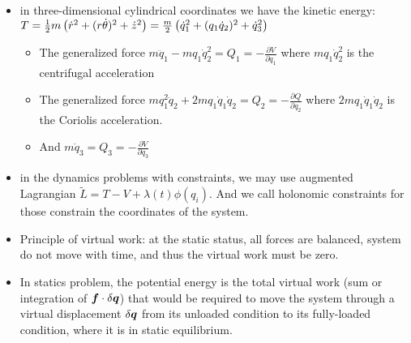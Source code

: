 \documentclass{article}
\begin{document}
\begin{itemize}
    \item in three-dimensional cylindrical coordinates we have the kinetic energy: \(T=\frac{1}{2}m\left( \dot r^2+(r\dot\theta)^2+\dot z^2 \right)=\frac{m}{2}\left( \dot q_1^2+(q_1\dot q_2)^2+\dot q_3^2 \right)\)
    \begin{itemize}
        \item The generalized force \(m\ddot q_1-mq_1\dot q_2^2=Q_1=-\frac{\partial V}{\partial q_1}\) where \(mq_1 \dot q_2^2\) is the centrifugal acceleration
        \item The generalized force \(mq_1^2\ddot q_2+2mq_1 \dot q_1\dot q_2=Q_2=-\frac{\partial Q}{\partial q_2}\) where \(2mq_1 \dot q_1\dot q_2\) is the Coriolis acceleration. 
        \item And \(m\ddot q_3=Q_3=-\frac{\partial V}{\partial q_3}\)
    \end{itemize}
    \item in the dynamics problems with constraints, we may use augmented Lagrangian \(\tilde L = T-V+\lambda(t) \phi(q_i)\). And we call holonomic constraints for those constrain the coordinates of the system.
    \item Principle of virtual work: at the static status, all forces are balanced, system do not move with time, and thus the virtual work must be zero.
    \item In statics problem, the potential energy is the total virtual work (sum or integration of \(\boldsymbol{f}\cdot \delta \boldsymbol{q}\)) that would be required to move the system through a virtual displacement \(\delta\boldsymbol{q}\) from its unloaded condition to its fully-loaded condition, where it is in static equilibrium. 
\end{itemize}
\end{document}
